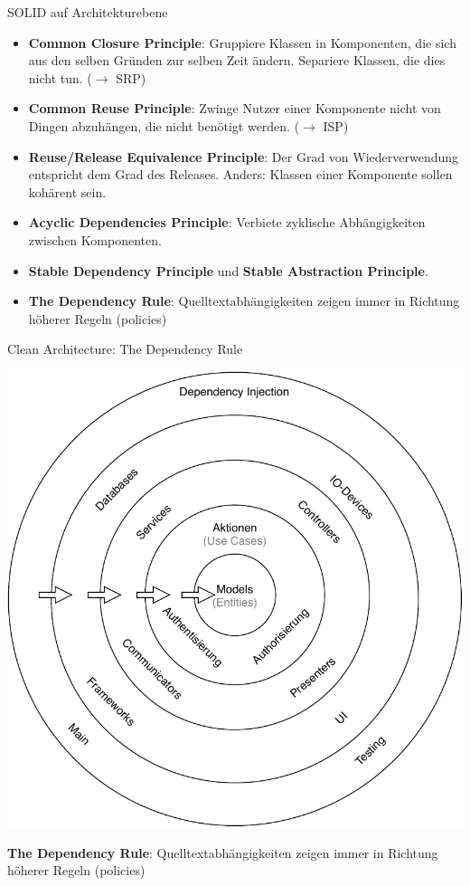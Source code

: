 \documentclass[10pt]{beamer}
\begin{document}
\begin{frame}{SOLID auf Architekturebene}
	\begin{itemize}
		\item<+-> \textbf{Common Closure Principle}: Gruppiere Klassen in Komponenten, die sich aus den selben Gründen zur selben Zeit ändern. Separiere Klassen, die dies nicht tun. ($\rightarrow$ SRP)
		\item<+-> \textbf{Common Reuse Principle}: Zwinge Nutzer einer Komponente nicht von Dingen abzuhängen, die nicht benötigt werden. ($\rightarrow$ ISP)
		\item<+-> \textbf{Reuse/Release Equivalence Principle}: Der Grad von Wiederverwendung entspricht dem Grad des Releases. Anders: Klassen einer Komponente sollen kohärent sein.
		\item<+-> \textbf{Acyclic Dependencies Principle}: Verbiete zyklische Abhängigkeiten zwischen Komponenten.
		\item<+-> {\color{gray} \textbf{Stable Dependency Principle} und \textbf{Stable Abstraction Principle}.}
		\item<+-> \textbf{The Dependency Rule}: Quelltextabhängigkeiten zeigen immer in Richtung höherer Regeln (policies)
	\end{itemize}
\end{frame}
\begin{frame}{Clean Architecture: The Dependency Rule}
	\begin{center}
		\includegraphics[scale=0.5]{clean-architecture}

		\textbf{The Dependency Rule}: Quelltextabhängigkeiten zeigen immer in Richtung höherer Regeln (policies)
	\end{center}
\end{frame}
\end{document}

